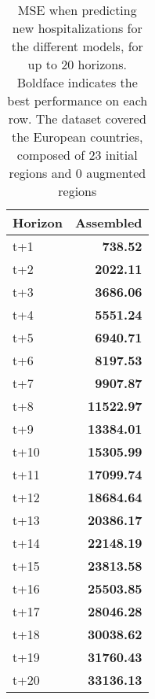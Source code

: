 \begin{table}[H]
\centering
\caption{MSE when predicting new hospitalizations for the different models, for up to 20 horizons. Boldface indicates the best performance on each row. The dataset covered the European countries, composed of 23 initial regions and 0 augmented regions }
\label{tab:MSE_comparison}
\begin{tabular}{lr}
\toprule
Horizon &  Assembled \\
\midrule
t+1  & \textbf{738.52}  \\
t+2  & \textbf{2022.11}  \\
t+3  & \textbf{3686.06}  \\
t+4  & \textbf{5551.24}  \\
t+5  & \textbf{6940.71}  \\
t+6  & \textbf{8197.53}  \\
t+7  & \textbf{9907.87}  \\
t+8  & \textbf{11522.97}  \\
t+9  & \textbf{13384.01}  \\
t+10  & \textbf{15305.99}  \\
t+11  & \textbf{17099.74}  \\
t+12  & \textbf{18684.64}  \\
t+13  & \textbf{20386.17}  \\
t+14  & \textbf{22148.19}  \\
t+15  & \textbf{23813.58}  \\
t+16  & \textbf{25503.85}  \\
t+17  & \textbf{28046.28}  \\
t+18  & \textbf{30038.62}  \\
t+19  & \textbf{31760.43}  \\
t+20  & \textbf{33136.13}  \\

\bottomrule
\end{tabular}
\end{table}
